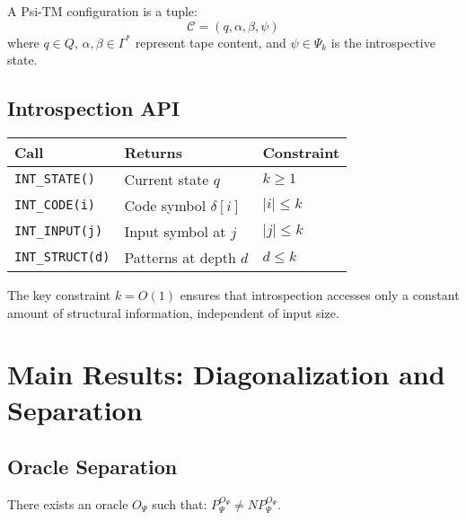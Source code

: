 \documentclass[11pt]{article}
\begin{document}
\begin{definition}[Configuration]
A Psi-TM configuration is a tuple:
$$\mathcal{C} = (q, \alpha, \beta, \psi)$$
where $q \in Q$, $\alpha, \beta \in \Gamma^*$ represent tape content, and $\psi \in \Psi_k$ is the introspective state.
\end{definition}

\subsection{Introspection API}

\begin{center}
\begin{tabular}{|l|l|l|}
\hline
\textbf{Call} & \textbf{Returns} & \textbf{Constraint} \\
\hline
\texttt{INT\_STATE()} & Current state $q$ & $k \geq 1$ \\
\texttt{INT\_CODE(i)} & Code symbol $\delta[i]$ & $|i| \leq k$ \\
\texttt{INT\_INPUT(j)} & Input symbol at $j$ & $|j| \leq k$ \\
\texttt{INT\_STRUCT(d)} & Patterns at depth $d$ & $d \leq k$ \\
\hline
\end{tabular}
\end{center}

The key constraint $k = O(1)$ ensures that introspection accesses only a constant amount of structural information, independent of input size.

\section{Main Results: Diagonalization and Separation}

\subsection{Oracle Separation}

\begin{theorem}
\label{thm:diagonal}
There exists an oracle $O_\Psi$ such that: $P^{O_\Psi}_\Psi \neq NP^{O_\Psi}_\Psi$.
\end{theorem}
\end{document}

